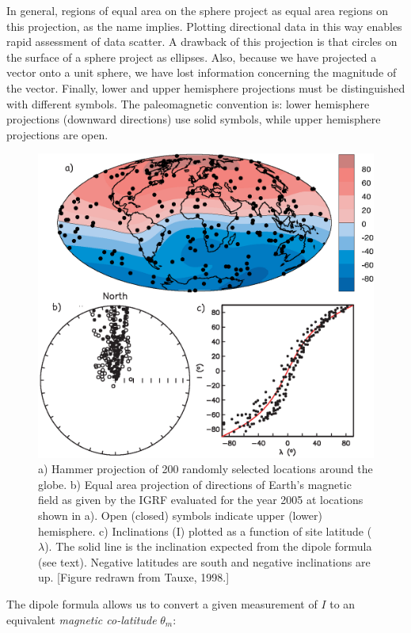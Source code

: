 In general, regions of equal area on the sphere project as equal
area regions on this projection, as the name implies.  
Plotting directional data in this way  enables rapid
assessment of data scatter.  A drawback
of this projection is that circles 
on the surface of a sphere project as ellipses.  Also, because we have
projected a vector onto a unit sphere, we have lost
information concerning the magnitude of the vector.
Finally, lower and upper hemisphere projections must be distinguished
with different symbols.  The paleomagnetic  convention is:
lower hemisphere projections (downward directions)  use solid
symbols, while upper hemisphere projections
are open. 

\begin{figure}[htb]
\centering  \includegraphics[width=11 cm]{EPSfiles/igrf.eps}
\caption{
a) Hammer projection of 200 randomly selected locations around the globe.
b) Equal area projection of directions of Earth's magnetic field as given 
by the
IGRF evaluated for the year 2005 at locations shown in a). Open (closed)
symbols indicate upper (lower) hemisphere. c) Inclinations
(I) plotted as a function of site latitude ($\lambda$). 
The solid line is the inclination
expected from the dipole formula (see text). Negative latitudes are
south and negative inclinations are up. [Figure redrawn from Tauxe, 1998.]}
\label{fig:igrf}
\end{figure}
\nocite{tauxe98}


The dipole formula allows us to convert a given measurement of $I$ to an equivalent
 {\it magnetic
co-latitude} $\theta_m$:

